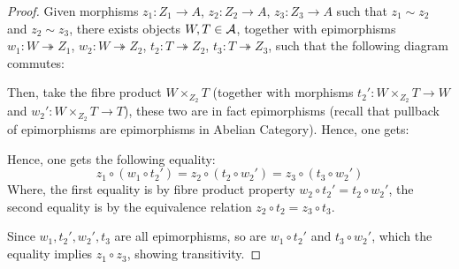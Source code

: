 \documentclass{article}
\begin{document}
\begin{proof}
    Given morphisms $z_1:Z_1\rightarrow A$, $z_2:Z_2\rightarrow A$, $z_3:Z_3\rightarrow A$ such that $z_1\sim z_2$ and $z_2\sim z_3$, there exists objects $W,T\in \cal{A}$, together with epimorphisms $w_1:W\twoheadrightarrow Z_1$, $w_2:W\twoheadrightarrow Z_2$, $t_2:T\twoheadrightarrow Z_2$, $t_3:T\twoheadrightarrow Z_3$, such that the following diagram commutes:
    \begin{center}
    \end{center}
    Then, take the fibre product $W\times_{Z_2}T$ (together with morphisms $t_2':W\times_{Z_2}T\rightarrow W$ and $w_2':W\times_{Z_2}T\rightarrow T$), these two are in fact epimorphisms (recall that pullback of epimorphisms are epimorphisms in Abelian Category). Hence, one gets:
    \begin{center}
    \end{center}
    Hence, one gets the following equality:
    $$z_1 \circ (w_1\circ t_2') = z_2 \circ (t_2\circ w_2') = z_3\circ (t_3\circ w_2')$$
    Where, the first equality is by fibre product property $w_2\circ t_2' = t_2\circ w_2'$, the second equality is by the equivalence relation $z_2\circ t_2=z_3\circ t_3$. 

    Since $w_1,t_2',w_2',t_3$ are all epimorphisms, so are $w_1\circ t_2'$ and $t_3\circ w_2'$, which the equality implies $z_1\circ z_3$, showing transitivity.
\end{proof}

\hfil
\end{document}
